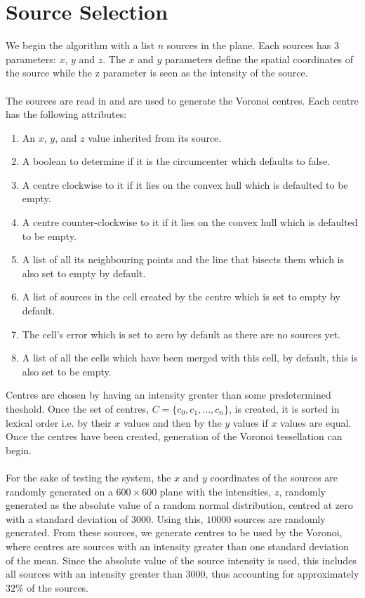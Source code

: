 \section{Source Selection}\label{sec:design:source}
We begin the algorithm with a list $n$ sources in the plane. Each sources has 3 parameters: $x$, $y$ and $z$. The $x$ and $y$ parameters define the spatial coordinates of the source while the z parameter is seen as the intensity of the source.
\\
\\
The sources are read in and are used to generate the Voronoi centres. Each centre has the following attributes:
\begin{enumerate}
\item An $x$, $y$, and $z$ value inherited from its source.
\item A boolean to determine if it is the circumcenter which defaults to false.
\item A centre clockwise to it if it lies on the convex hull which is defaulted to be empty.
\item A centre counter-clockwise to it if it lies on the convex hull which is defaulted to be empty.
\item A list of all its neighbouring points and the line that bisects them which is also set to empty by default.
\item A list of sources in the cell created by the centre which is set to empty by default.
\item The cell's error which is set to zero by default as there are no sources yet.
\item A list of all the cells which have been merged with this cell, by default, this is also set to be empty.
\end{enumerate} 
Centres are chosen by having an intensity greater than some predetermined theshold. Once the set of centres, $C= \{c_0,c_1,...,c_n\}$, is created, it is sorted in lexical order i.e. by their $x$ values and then by the $y$ values if $x$ values are equal. Once the centres have been created, generation of the Voronoi tessellation can begin.
\\
\\
For the sake of testing the system, the $x$ and $y$ coordinates of the sources are randomly generated on a $600 \times 600$ plane with the intensities, $z$, randomly generated as the absolute value of a random normal distribution, centred at zero with a standard deviation of $3000$. Using this, $10000$ sources are randomly generated. From these sources, we generate centres to be used by the Voronoi, where centres are sources with an intensity greater than one standard deviation of the mean. Since the absolute value of the source intensity is used, this includes all sources with an intensity greater than 3000, thus accounting for approximately $32\%$ of the sources.
